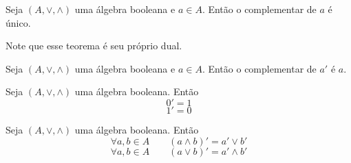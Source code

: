 \begin{teo}
	Seja $(A, \vee ,\wedge)$ uma álgebra booleana e $a \in A$. Então o complementar de $a$ é único.
\end{teo}

	Note que esse teorema é seu próprio dual.

\begin{teo}
	Seja $(A, \vee ,\wedge)$ uma álgebra booleana e $a \in A$. Então o complementar de $a'$ é $a$.
\end{teo}

\begin{teo}
	Seja $(A, \vee ,\wedge)$ uma álgebra booleana. Então
	\begin{equation*}
	0'=1
	\end{equation*}
	\begin{equation*}
	1'=0
	\end{equation*}
\end{teo}

\begin{teo}
\label{prop:de.morgan}
	Seja $(A, \vee ,\wedge)$ uma álgebra booleana. Então
	\begin{equation*}
	\forall a,b \in A \qquad (a \wedge b)'=a' \vee b'
	\end{equation*}
	\begin{equation*}
	\forall a,b \in A \qquad (a  \vee  b)'=a' \wedge b'
	\end{equation*}
\end{teo}